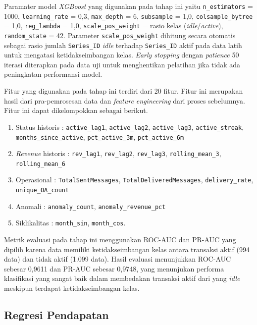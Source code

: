 Paramater model \textit{XGBoost} yang digunakan pada tahap ini yaitu \texttt{n\_estimators} = 1000, \texttt{learning\_rate} = 0{,}3, \texttt{max\_depth} = 6, \texttt{subsample} = 1{,}0, \texttt{colsample\_bytree} = 1{,}0, \texttt{reg\_lambda} = 1{,}0, \texttt{scale\_pos\_weight} = rasio kelas (\textit{idle}/\textit{active}), \texttt{random\_state} = 42. Parameter \texttt{scale\_pos\_weight} dihitung secara otomatis sebagai rasio jumlah \texttt{Series\_ID} \textit{idle} terhadap \texttt{Series\_ID} aktif pada data latih untuk mengatasi ketidakseimbangan kelas. \textit{Early stopping} dengan \textit{patience} 50 iterasi diterapkan pada data uji untuk menghentikan pelatihan jika tidak ada peningkatan performansi model. 

Fitur yang digunakan pada tahap ini terdiri dari 20 fitur. Fitur ini merupakan hasil dari pra-pemrosesan data dan \textit{feature engineering} dari proses sebelumnya. Fitur ini dapat dikelompokkan sebagai berikut.
\begin{enumerate}
    \item Status historis : \texttt{active\_lag1}, \texttt{active\_lag2}, \texttt{active\_lag3}, \texttt{active\_streak}, \texttt{months\_since\_active}, \texttt{pct\_active\_3m}, \texttt{pct\_active\_6m}
    \item \textit{Revenue} historis : \texttt{rev\_lag1}, \texttt{rev\_lag2}, \texttt{rev\_lag3}, \texttt{rolling\_mean\_3}, \texttt{rolling\_mean\_6} 
    \item Operasional : \texttt{TotalSentMessages}, \texttt{TotalDeliveredMessages}, \texttt{delivery\_rate}, \texttt{unique\_OA\_count}
    \item Anomali : \texttt{anomaly\_count}, \texttt{anomaly\_revenue\_pct}
    \item Siklikalitas : \texttt{month\_sin}, \texttt{month\_cos}.
\end{enumerate}

Metrik evaluasi pada tahap ini menggunakan ROC-AUC dan PR-AUC yang dipilih karena data memiliki ketidakseimbangan kelas antara transaksi aktif (994 data) dan tidak aktif (1.099 data). Hasil evaluasi menunjukkan ROC-AUC sebesar 0,9611 dan PR-AUC sebesar 0,9748, yang menunjukan performa klasifikasi yang sangat baik dalam membedakan transaksi aktif dari yang \textit{idle} meskipun terdapat ketidakseimbangan kelas.

\subsection{Regresi Pendapatan}
\label{subsubsec:stage2_regresi}

